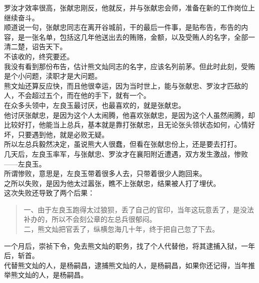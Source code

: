 \begin{multicols}{\theparacolNo}
罗汝才效率很高，张献忠刚反，他就反，并与张献忠会师，准备在新的工作岗位上继续奋斗。\\

顺道说一句，张献忠同志在离开谷城前，干的最后一件事，是贴布告，布告的内容，是一张名单，包括这几年他送出去的贿赂，金额，以及受贿人的名字，全部一清二楚，诏告天下。\\

不该收的，终究要还。\\

我没有看到那份布告，估计熊文灿同志的名字，应该名列前茅。但此时此刻，受贿是个小问题，渎职才是大问题。\\

熊文灿还算反应快，而且他很幸运，因为当时世上，能与张献忠、罗汝才匹敌的人，不会超过五个，而在他的手下，就有一个。\\

在众多头领中，左良玉最讨厌，也最喜欢的，就是张献忠。\\

他讨厌张献忠，是因为这个人太闹腾，他喜欢张献忠，是因为这个人虽然闹腾，却比较好打，他能当上总兵，基本就是靠打张献忠，且无论张头领状态如何，心情好坏，只要遇到他，就是必败无疑。\\

所以左总兵毅然决定，虽说熊大人很蠢，但看在张献忠份上，还是要去打打。\\

几天后，左良玉率军，与张献忠、罗汝才在襄阳附近遭遇，双方发生激战，惨败——左良玉。\\

所谓惨败，意思是，左良玉带着很多人去，只带着很少人跑回来。\\

之所以失败，是因为他太过嚣张，瞧不上张献忠，结果被人打了埋伏。\\

这次失败还导致了两个后果：
{\footnotesize \begin{quote}
	一、由于左良玉跑得太过狼狈，丢了自己的官印，当年这玩意丢了，是没法补办的，所以不会刻公章的左总兵很郁闷。\\
	二，熊文灿把官丢了，纵横忽海几十年，终于把自己忽了下去。\\
\end{quote}}

一个月后，崇祯下令，免去熊文灿的职务，找了个人代替他，将其逮捕入狱，一年后，斩首。\\

代替熊文灿的人，是杨嗣昌，逮捕熊文灿的人，是杨嗣昌，如果你还记得，当年推举熊文灿的人，是杨嗣昌。\\


\end{multicols}
